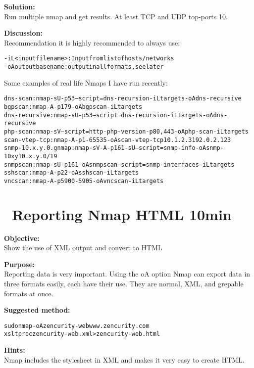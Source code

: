 \documentclass[a4paper,11pt,notitlepage]{report}
\begin{document}
{\bf Solution:}\\
Run multiple nmap and get results. At least TCP and UDP top-ports 10.

{\bf Discussion:}\\
Recommendation it is highly recommended to always use:
\begin{alltt}
-iL <inputfilename>: Input from list of hosts/networks
-oA outputbasename: output in all formats, see later
\end{alltt}

Some examples of real life Nmaps I have run recently:
\begin{alltt}
dns-scan: nmap -sU -p 53 --script=dns-recursion -iL targets -oA dns-recursive
bgpscan: nmap -A -p 179 -oA bgpscan -iL targets
dns-recursive: nmap -sU -p 53 --script=dns-recursion -iL targets -oA dns-recursive
php-scan: nmap -sV --script=http-php-version -p80,443 -oA php-scan -iL targets
scan-vtep-tcp: nmap -A -p 1-65535 -oA scan-vtep-tcp 10.1.2.3 192.0.2.123
snmp-10.x.y.0.gnmap: nmap -sV -A -p 161 -sU --script=snmp-info -oA snmp-10xy 10.x.y.0/19
snmpscan: nmap -sU -p 161 -oA snmpscan --script=snmp-interfaces -iL targets
sshscan: nmap -A -p 22 -oA sshscan -iL targets
vncscan: nmap -A -p 5900-5905 -oA vncscan -iL targets
\end{alltt}




\chapter{\faInfoCircle\ Reporting Nmap HTML 10min}
\label{ex:nmap-html}


{\bf Objective:} \\
Show the use of XML output and convert to HTML

{\bf Purpose:}\\
Reporting data is very important. Using the oA option Nmap can export data in three formats easily, each have their use. They are normal, XML, and grepable formats at once.

{\bf Suggested method:}\\
\begin{alltt}
  sudo nmap -oA zencurity-web www.zencurity.com
  xsltproc zencurity-web.xml > zencurity-web.html
\end{alltt}

{\bf Hints:} \\
Nmap includes the stylesheet in XML and makes it very easy to create HTML.
\end{document}
